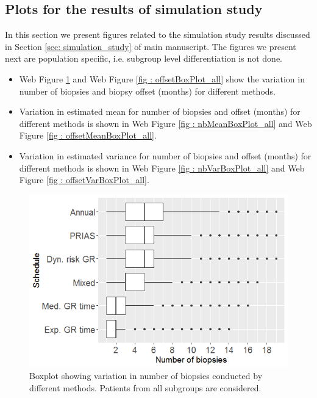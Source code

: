 \subsection{Plots for the results of simulation study}
In this section we present figures related to the simulation study results discussed in Section \ref{sec: simulation_study} of main manuscript. The figures we present next are population specific, i.e. subgroup level differentiation is not done.

\begin{itemize}
  \item Web Figure \ref{fig : nbBoxPlot_all} and Web Figure \ref{fig : offsetBoxPlot_all} show the variation in number of biopsies and biopsy offset (months) for different methods.
  \item Variation in estimated mean for number of biopsies and offset (months) for different methods is shown in Web Figure \ref{fig : nbMeanBoxPlot_all} and Web Figure \ref{fig : offsetMeanBoxPlot_all}.
  \item Variation in estimated variance for number of biopsies and offset (months) for different methods is shown in Web Figure \ref{fig : nbVarBoxPlot_all} and Web Figure \ref{fig : offsetVarBoxPlot_all}.
\end{itemize}

\begin{figure}[!htb]
\centerline{\includegraphics[width=\columnwidth]{images/sim_study/nbBoxPlot_all.png}}
\caption{Boxplot showing variation in number of biopsies conducted by different methods. Patients from all subgroups are considered.}
\label{fig : nbBoxPlot_all}
\end{figure}


